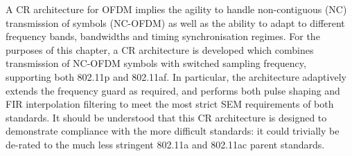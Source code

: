 A CR architecture for OFDM implies the agility to handle non-contiguous (NC) transmission of symbols (NC-OFDM) as well as the ability to adapt to different frequency bands, bandwidths and timing synchronisation regimes.
For the purposes of this chapter, a CR architecture is developed which combines  transmission of NC-OFDM symbols with switched sampling frequency, supporting both 802.11p and 802.11af.
In particular, the architecture adaptively extends the frequency guard as required, and performs both pulse shaping and FIR interpolation filtering to meet the most strict SEM requirements of both standards.
It should be understood that this CR architecture is designed to demonstrate compliance with the more difficult standards: it could trivially be de-rated to the much less stringent 802.11a and 802.11ac parent standards.

